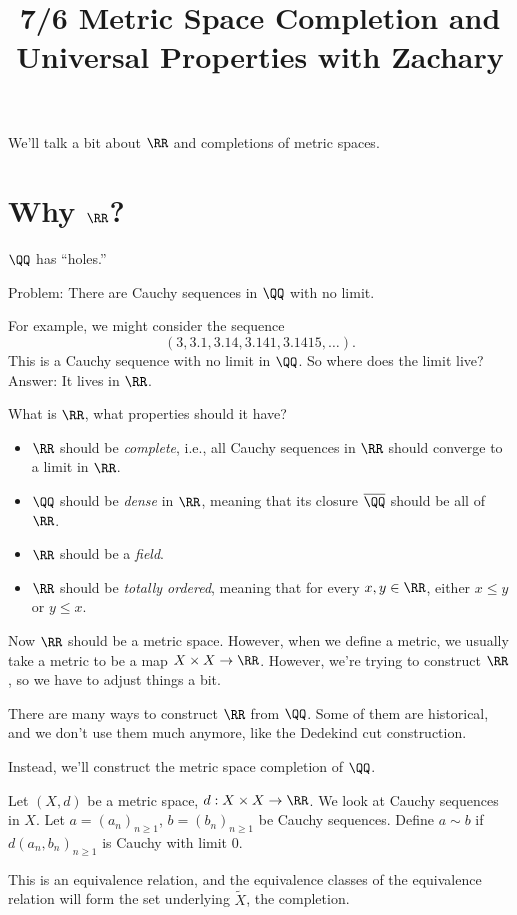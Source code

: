 \documentclass{article}
\title{7/6 Metric Space Completion and Universal Properties with Zachary}
\newcommand\oln\overline
\begin{document}
We'll talk a bit about $\RR$ and completions of metric spaces.

\section{Why $\RR$?}

$\QQ$ has ``holes.'' 

Problem: There are Cauchy sequences in $\QQ$ with 
no limit.

For example, we might consider the sequence 
\[(3,3.1,3.14,3.141,3.1415,\ldots).\]
This is a Cauchy sequence with no limit in $\QQ$.
So where does the limit live? Answer: It lives in $\RR$.

What is $\RR$, what properties should it have?
\begin{itemize}
    \item $\RR$ should be \emph{complete}, i.e., all 
        Cauchy sequences in $\RR$ should converge to a
        limit in $\RR$.
    \item $\QQ$ should be \emph{dense} in $\RR$, 
        meaning that its closure $\oln{\QQ}$ should be 
        all of $\RR$.
    \item $\RR$ should be a \emph{field}.
    \item $\RR$ should be \emph{totally ordered}, meaning 
        that for every $x,y\in\RR$, either 
        $x\le y$ or $y\le x$.
\end{itemize}

Now $\RR$ should be a metric space. However, when we define
a metric, we usually take a metric to be a map $X\times X\to \RR$.
However, we're trying to construct $\RR$, so we have to 
adjust things a bit.

There are many ways to construct $\RR$ from $\QQ$. Some of them 
are historical, and we don't use them much anymore, like the 
Dedekind cut construction.

Instead, we'll construct the metric space completion of $\QQ$.

\begin{definition}
    Let $(X,d)$ be a metric space, $d:X\times X\to \RR$. 
    We look at 
    Cauchy sequences in $X$.
    Let $a=(a_n)_{n\ge 1}$, 
    $b=(b_n)_{n\ge 1}$ be Cauchy sequences.
    Define $a\sim b$ if $d(a_n,b_n)_{n\ge 1}$ is Cauchy with 
    limit $0$.

    This is an equivalence relation, and the equivalence 
    classes of the equivalence relation will form the set 
    underlying $\tilde{X}$, the completion.
\end{definition}
\end{document}
